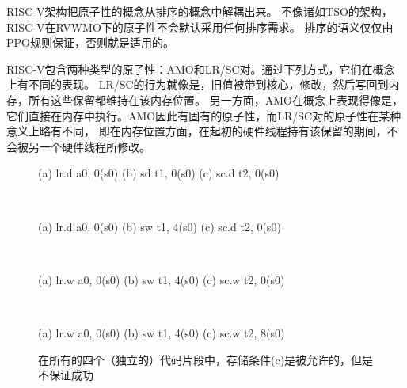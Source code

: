 RISC-V架构把原子性的概念从排序的概念中解耦出来。
不像诸如TSO的架构，RISC-V在RVWMO下的原子性不会默认采用任何排序需求。
排序的语义仅仅由PPO规则保证，否则就是适用的。

RISC-V包含两种类型的原子性：AMO和LR/SC对。通过下列方式，它们在概念上有不同的表现。
LR/SC的行为就像是，旧值被带到核心，修改，然后写回到内存，所有这些保留都维持在该内存位置。
另一方面，AMO在概念上表现得像是，它们直接在内存中执行。AMO因此有固有的原子性，而LR/SC对的原子性在某种意义上略有不同，
即在内存位置方面，在起初的硬件线程持有该保留的期间，不会被另一个硬件线程所修改。

\begin{figure}[h!]
  \centering\small
  \begin{verbbox}
  (a) lr.d a0, 0(s0)
  (b) sd   t1, 0(s0)
  (c) sc.d t2, 0(s0)
  \end{verbbox}
  \theverbbox
  ~~~~~~
  \begin{verbbox}
  (a) lr.d a0, 0(s0)
  (b) sw   t1, 4(s0)
  (c) sc.d t2, 0(s0)
  \end{verbbox}
  \theverbbox
  ~~~~~~
  \begin{verbbox}
  (a) lr.w a0, 0(s0)
  (b) sw   t1, 4(s0)
  (c) sc.w t2, 0(s0)
  \end{verbbox}
  \theverbbox
  ~~~~~~
  \begin{verbbox}
  (a) lr.w a0, 0(s0)
  (b) sw   t1, 4(s0)
  (c) sc.w t2, 8(s0)
  \end{verbbox}
  \theverbbox
  \caption{在所有的四个（独立的）代码片段中，存储条件(c)是被允许的，但是不保证成功
    }
  \label{fig:litmus:lrsdsc}
\end{figure}

